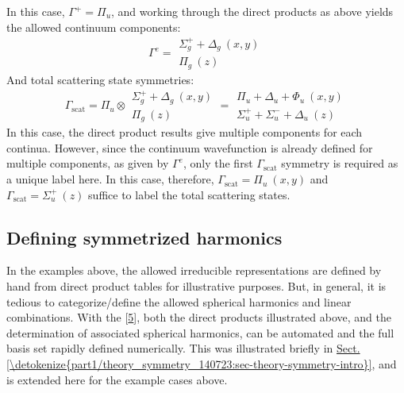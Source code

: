 \documentclass[letterpaper,table,10pt,english]{jupyterBook}
\begin{document}
\sphinxAtStartPar
In this case, \(\Gamma^{+} = \Pi_u\), and \sphinxhyphen{} working through the direct products as above \sphinxhyphen{} yields the allowed continuum components:
\label{equation:part2/sym-fitting-intro_240723:ae1ff879-d29b-4dc1-b6e8-d7c84040f535}\begin{equation}
\Gamma^{e}=\begin{array}{c}
\Sigma_{g}^{+} + \Delta_{g}~(x,y)\\
\Pi_{g}~(z)
\end{array}
\end{equation}
\sphinxAtStartPar
And total scattering state symmetries:
\label{equation:part2/sym-fitting-intro_240723:c7f101ff-302b-46f9-8c2e-2f63f8db084a}\begin{equation}
\Gamma_{\mathrm{scat}}=\Pi_{u}\otimes\begin{array}{c}
\Sigma_{g}^{+} + \Delta_{g}~(x,y)\\
\Pi_{g}~(z)
\end{array}=\begin{array}{c}
\Pi_{u} + \Delta_{u} + \Phi_{u}~(x,y)\\
\Sigma_{u}^{+} + \Sigma_{u}^{-} + \Delta_{u}~(z)
\end{array}
\end{equation}
\sphinxAtStartPar
In this case, the direct product results give multiple components for each continua. However, since the continuum wavefunction is already defined for multiple components, as given by \(\Gamma^{e}\), only the first \(\Gamma_{\mathrm{scat}}\) symmetry is required as a unique label here. In this case, therefore, \(\Gamma_{\mathrm{scat}} = \Pi_{u}~(x,y)\) and \(\Gamma_{\mathrm{scat}} =\Sigma_{u}^{+}~(z)\) suffice to label the total scattering states.


\subsection{Defining symmetrized harmonics}
\label{\detokenize{part2/sym-fitting-intro_240723:defining-symmetrized-harmonics}}
\sphinxAtStartPar
In the examples above, the allowed irreducible representations are defined by hand from direct product tables for illustrative purposes. But, in general, it is tedious to categorize/define the allowed spherical harmonics and linear combinations. With the  {[}\hyperlink{cite.backmatter/bibliography:id682}{5}{]}, both the direct products illustrated above, and the determination of associated spherical harmonics, can be automated and the full basis set rapidly defined numerically. This was illustrated briefly in \hyperref[\detokenize{part1/theory_symmetry_140723:sec-theory-symmetry-intro}]{Sect.\@ \ref{\detokenize{part1/theory_symmetry_140723:sec-theory-symmetry-intro}}}, and is extended here for the example cases above.
\end{document}
